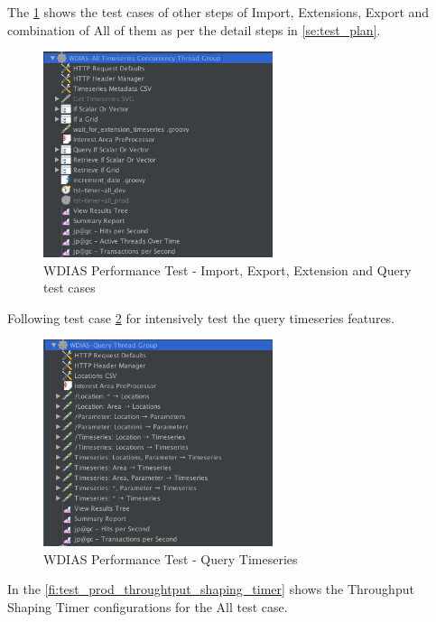 The \ref{fi:test_all_cases} shows the test cases of other steps of Import, Extensions, Export and combination of All of them as per the detail steps in \ref{se:test_plan}.

\begin{figure}[htp]
    \centering
    \includegraphics[width=0.6\textwidth]{results/work_load/test_all_cases.png}
    \caption{WDIAS Performance Test - Import, Export, Extension and Query test cases}
    \label{fi:test_all_cases}
\end{figure}

Following test case \ref{fi:test_query_timeseries} for intensively test the query timeseries features.

\begin{figure}[htp]
    \centering
    \includegraphics[width=0.6\textwidth]{results/work_load/test_query_timeseries.png}
    \caption{WDIAS Performance Test - Query Timeseries}
    \label{fi:test_query_timeseries}
\end{figure}

In the \ref{fi:test_prod_throughtput_shaping_timer} shows the Throughput Shaping Timer configurations for the All test case.

